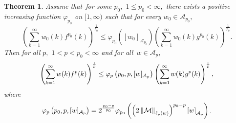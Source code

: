 \documentclass[a4paper]{amsart}
\theoremstyle{plain}
\newtheorem{theorem}{Theorem}[section]
\numberwithin{equation}{section}
\begin{document}
\begin{theorem}
\label{T1}Assume that\ for some $p_{0},$ $1\leq p_{0}<\infty ,$ there exists
a positive increasing function $\mathcal{\varphi }_{p_{0}}$ on $[1,\infty )$
such that for every $w_{0}\in \mathcal{A}_{p_{0}},$%
\begin{equation}
\left( \sum_{k=1}^{\infty }w_{0}(k)f^{p_{0}}(k)\right) ^{\frac{1}{p_{0}}%
}\leq \mathcal{\varphi }_{p_{0}}\left( [w_{0}]_{\mathcal{A}_{p_{0}}}\right)
\left( \sum_{k=1}^{\infty }w_{0}(k)g^{p_{0}}(k)\right) ^{\frac{1}{p_{0}}}.
\label{*}
\end{equation}%
Then for all $p,$ $1<p<p_{0}<\infty $ and for all\ $w\in \mathcal{A}_{p},$%
\begin{equation}
\left( \sum_{k=1}^{\infty }w(k)f^{p}(k)\right) ^{\frac{1}{p}}\leq \mathcal{%
\varphi }_{p}\left( p_{0},p,[w]_{\mathcal{A}_{p}}\right) \left(
\sum_{k=1}^{\infty }w(k)g^{p}(k)\right) ^{\frac{1}{p}},  \label{*1}
\end{equation}%
where 
\begin{equation}
\mathcal{\varphi }_{p}\left( p_{0},p,[w]_{\mathcal{A}_{p}}\right) =2^{\frac{%
p_{0}-p}{p_{0}}}\mathcal{\varphi }_{p_{0}}\left( \left( 2\left\Vert \mathcal{%
M}\right\Vert _{\ell _{p}(w)}\right) ^{p_{0}-p}\left[ w\right] _{\mathcal{A}%
_{p}}\right) .  \label{**}
\end{equation}
\end{theorem}
\end{document}
